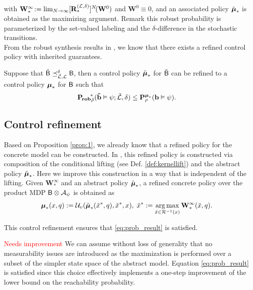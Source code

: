 \documentclass{ifacconf}
\begin{document}
with
$\mathbf W^\infty_\ast \!:=  \lim_{N\rightarrow\infty}[{\mathbf {R}}_\ast^{(\mathcal{L},\delta)}]^N\! (\mathbf W^0)$ and $\mathbf W^0\equiv0$, and an associated policy $\tilde {{\boldsymbol{\mu}}}_\ast$ is obtained as the maximizing argument. Remark this robust probability is parameterized by the set-valued labeling and the $\delta$-difference in the stochastic transitions.
\\
From the robust synthesis results in \citep{tech_report_TACAS},
we know  that there exists a refined control policy with inherited guarantees.
\begin{prop}\label{prop:1}
  Suppose that %
  $\tilde{\mathsf{B}}\preceq^{\delta}_{\tilde{\mathcal{L}},\mathcal{L}}  \mathsf{B}$, then a control policy ${\tilde {{\boldsymbol{\mu}}}}_\ast$ for $\tilde {\mathsf{B}}$ can be refined to a control policy ${\boldsymbol{\mu}}_\ast$ for $\mathsf{B}$ such that %
  \begin{equation}
  \label{eq:prob_result}
    \mathbf{P_{\! rob}}_{\tilde {\rho}}^{\!\ast}(\mathbf{\tilde b} \vDash\psi; \tilde{\mathcal{L}},\delta)\leq  \mathbf P _{\rho}^{{\boldsymbol{\mu}}_\ast}( \mathbf{b} \vDash\psi).
  \end{equation}
\end{prop}



\subsection{Control refinement}
\label{sec:control}

Based on Proposition \ref{prop:1}, we already know that a refined policy for the concrete model can be constructed. In \cite{tech_report_TACAS}, this refined policy is constructed via composition of the conditional lifting %
 (see Def. \ref{def:kernellift}) and the abstract policy $\tilde  {{\boldsymbol{\mu}}}_\ast$. Here we improve this construction in a way that is independent of the lifting. Given $\mathbf{W}^\infty_\ast$ and an abstract policy $\tilde {{\boldsymbol{\mu}}}_\ast$, a refined concrete policy over the product MDP $\mathsf{B}\otimes\mathcal{A}_\psi$ is obtained as
\begin{equation*}
		{\boldsymbol{\mu}}_\ast(x,q): = \mathcal{U}_{v}( \tilde{{\boldsymbol{\mu}}}_\ast(\tilde x^*, q), \tilde x^*, x), \; \tilde x^*:=\operatorname*{arg\,max}_{ \tilde x\in
		\mathcal{R}^{-1}(x)} \mathbf  W^\infty_\ast(\tilde x,q).
\end{equation*}
\begin{prop}
  This control refinement ensures that \eqref{eq:prob_result} is satisfied.
\end{prop}
\begin{pf}
  \textcolor{red}{Needs improvement} We can assume without loss of generality that no measurability issues are introduced as the maximization is performed over a subset of the simpler state space of the abstract model. Equation \eqref{eq:prob_result} is satisfied since this choice effectively implements a one-step improvement of the lower bound on the reachability probability. 
\end{pf}
\end{document}
